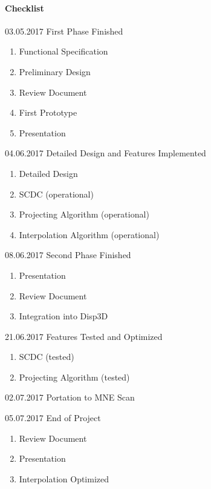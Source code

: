 \paragraph{Checklist}
\begin{aims}
	\item[03.05.2017]First Phase Finished
	\begin{enumerate}\itemsep0pt 
		\item Functional Specification
		\item Preliminary Design
		\item Review Document
		\item First Prototype
		\item Presentation
	\end{enumerate}
	
	\item[04.06.2017]Detailed Design and Features Implemented
	\begin{enumerate}\itemsep0pt
		\item Detailed Design
		\item SCDC (operational)
		\item Projecting Algorithm (operational)
		\item Interpolation Algorithm (operational)
	\end{enumerate}
	
	\item[08.06.2017]Second Phase Finished
	\begin{enumerate}\itemsep0pt
		\item Presentation
		\item Review Document
		\item Integration into Disp3D
	\end{enumerate}

	\item[21.06.2017]Features Tested and Optimized
	\begin{enumerate}\itemsep0pt
		\item SCDC (tested)
		\item Projecting Algorithm (tested)
	\end{enumerate}
	
	\item[02.07.2017]Portation to MNE Scan
	
	\item[05.07.2017]End of Project
	\begin{enumerate}\itemsep0pt
		\item Review Document
		\item Presentation
		\item Interpolation Optimized
	\end{enumerate}


\end{aims}


